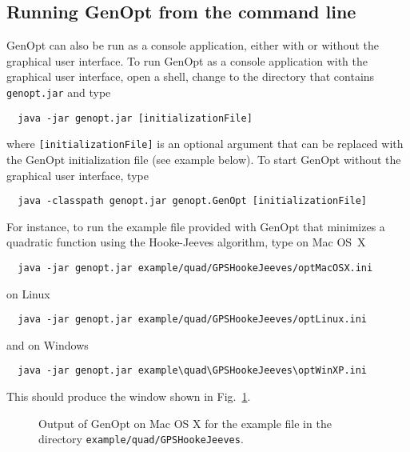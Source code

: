 \subsection{Running GenOpt from the command line}
GenOpt can also be run as a console application, either with or without the graphical user interface. 
To run GenOpt as a console application with the graphical user interface, open a shell, change to the directory that contains
{\tt genopt.jar} and type
\begin{lstlisting}
  java -jar genopt.jar [initializationFile]
\end{lstlisting}
where {\tt [initializationFile]} is an optional argument that can be
replaced with the GenOpt initialization file (see example below).
To start GenOpt without the graphical user interface, type
\begin{lstlisting}
  java -classpath genopt.jar genopt.GenOpt [initializationFile]
\end{lstlisting}
\newpage
For instance, to run the example file provided with GenOpt that minimizes a quadratic function using the Hooke-Jeeves algorithm, 
type on Mac OS~X
\begin{lstlisting}
  java -jar genopt.jar example/quad/GPSHookeJeeves/optMacOSX.ini
\end{lstlisting}
on Linux
\begin{lstlisting}
  java -jar genopt.jar example/quad/GPSHookeJeeves/optLinux.ini
\end{lstlisting}
and on Windows 
\begin{lstlisting}
  java -jar genopt.jar example\quad\GPSHookeJeeves\optWinXP.ini
\end{lstlisting}
This should produce the window shown in Fig.~\ref{fig:wingenoptGPSHJ}.

\begin{figure}
\centering
{}
\caption{Output of GenOpt on Mac OS X for the example file in the directory {\tt example/quad/GPSHookeJeeves}.}
\label{fig:wingenoptGPSHJ}
\end{figure}
